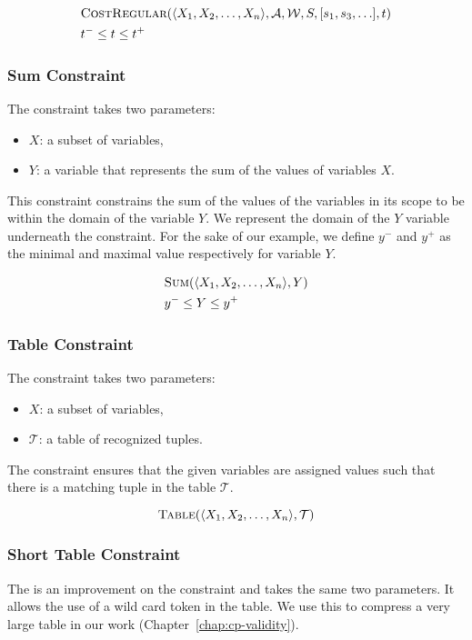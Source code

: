 \documentclass[../Document.tex]{subfiles}
\begin{document}
\begin{align*}
    &\mbox{\sc CostRegular}(\langle X_1, X_2, \ldots, X_n \rangle, \mathcal{A}, \mathcal{W}, S, [s_1, s_3, \ldots], t)\\
    &t^- \leq t \leq t^+
\end{align*}

\subsubsection{Sum Constraint}
The \somme constraint takes two parameters:
\begin{itemize}
    \item $X$: a subset of variables,
    \item $Y$: a variable that represents the sum of the values of variables $X$.
\end{itemize}

This constraint constrains the sum of the values of the variables in its scope to be within the domain of the variable $Y$.
We represent the domain of the $Y$ variable underneath the \somme constraint. For the sake of our example, we define $y^-$ and $y^+$ as the minimal and maximal value respectively for variable $Y$.

\begin{align*}
    &\mbox{\sc Sum}(\langle X_1, X_2, \ldots, X_n \rangle, Y)\\
    &y^- \leq Y \leq y^+
\end{align*}

\subsubsection{Table Constraint}
The \extensional constraint takes two parameters:
\begin{itemize}
    \item $X$: a subset of variables,
    \item $\mathcal{T}$: a table of recognized tuples.
\end{itemize}

The \extensional constraint ensures that the given variables are assigned values such that there is a matching tuple in the table $\mathcal{T}$.

$$
    \mbox{\sc Table}(\langle X_1, X_2, \ldots, X_n \rangle, \mathcal{T})
$$

\subsubsection{Short Table Constraint}
The \shortTable is an improvement on the \extensional constraint and takes the same two parameters.
It allows the use of a wild card token in the table.
We use this to compress a very large table in our work (Chapter~\ref{chap:cp-validity}).
\end{document}
